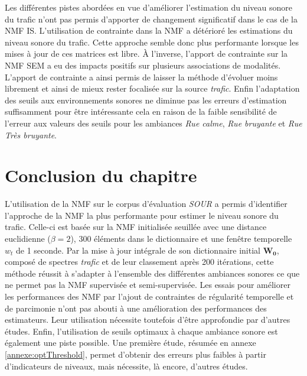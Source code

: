 Les différentes pistes abordées en vue d'améliorer l'estimation du niveau sonore du trafic n'ont pas permis d'apporter de changement significatif dans le cas de la NMF IS. L'utilisation de contrainte dans la NMF a détérioré les estimations du niveau sonore du trafic. Cette approche semble donc plus performante lorsque les mises à jour de ces matrices est libre. À l'inverse, l'apport de contrainte sur la NMF SEM a eu des impacts positifs sur plusieurs associations de modalités. L'apport de contrainte a ainsi permis de laisser la méthode d'évoluer moins librement et ainsi de mieux rester focalisée sur la source \textit{trafic}. Enfin l'adaptation des seuils aux environnements sonores ne diminue pas les erreurs d'estimation suffisamment pour être intéressante cela en raison de la faible sensibilité de l'erreur aux valeurs des seuils pour les ambiances \textit{Rue calme}, \textit{Rue bruyante} et \textit{Rue Très bruyante}.
\\

\section{Conclusion du chapitre}
L'utilisation de la NMF sur le corpus d'évaluation \textit{SOUR} a permis d'identifier l'approche de la NMF la plus performante pour estimer le niveau sonore du trafic. Celle-ci est basée sur la NMF initialisée seuillée avec une distance euclidienne ($\beta = 2$), 300 éléments dans le dictionnaire et une fenêtre temporelle $w_t$ de 1 seconde. Par la mise à jour intégrale de son dictionnaire initial $\mathbf{W_0}$, composé de spectres \textit{trafic} et de leur classement après 200 itérations, cette méthode réussit à s'adapter à l'ensemble des différentes ambiances sonores ce que ne permet pas la NMF supervisée et semi-supervisée. Les essais pour améliorer les performances des NMF par l'ajout de contraintes de régularité temporelle et de parcimonie n'ont pas abouti à une amélioration des performances des estimateurs. Leur utilisation nécessite toutefois d'être approfondie par d'autres études. Enfin, l'utilisation de seuils optimaux à chaque ambiance sonore est également une piste possible. Une première étude, résumée en annexe \ref{annexe:optThreshold}, permet d'obtenir des erreurs plus faibles à partir d'indicateurs de niveaux, mais nécessite, là encore, d'autres études. 

%